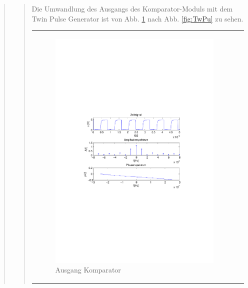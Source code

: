 \begin{quote}
\begin{quote}
        Die Umwandlung des Ausgangs des Komparator-Moduls mit dem Twin Pulse
        Generator ist von Abb. \ref{fig:AusgangCom} nach Abb. \ref{fig:TwPu}
        zu sehen.
        
         \begin{center}
            \begin{tabular}{ll}
            
            \hspace{-5cm}
                \begin{minipage}{0.67\textwidth}
                    \begin{figure}[H]
                        \label{fig:AusgangCom}
                        \includegraphics[scale=0.7, trim = 35mm 100mm 35mm 95mm, clip]{Bilder/AusgangComparator}
                        \caption{Ausgang Komparator}
                    \end{figure}
                \end{minipage}
                

\end{tabular}
\end{center}
\end{quote}
\end{quote}
